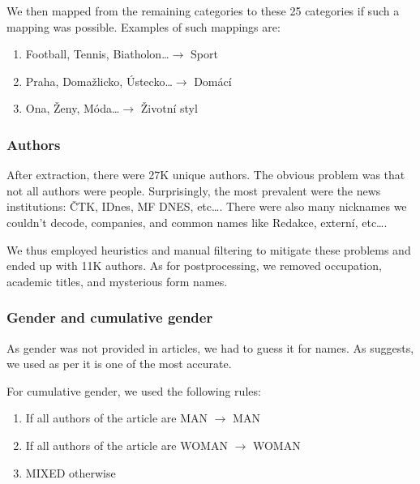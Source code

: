 \begin{itemize}
We then mapped from the remaining categories to these 25 categories if such a mapping was possible.
Examples of such mappings are:
\begin{enumerate}
    \item Football, Tennis, Biatholon\dots $\rightarrow$ Sport
    \item Praha, Domažlicko, Ústecko\dots $\rightarrow$ Domácí
    \item Ona, Ženy, Móda\dots $\rightarrow$ Životní styl
\end{enumerate}


\subsubsection{Authors}
\label{sec:authors}
After extraction, there were 27K unique authors.
The obvious problem was that not all authors were people.
Surprisingly, the most prevalent were the news institutions: ČTK, IDnes, MF DNES, etc\dots.
There were also many nicknames we couldn't decode, companies,
and common names like Redakce, externí, etc\dots.

We thus employed heuristics and manual filtering 
to mitigate these problems and ended up with 11K authors.
As for postprocessing, we removed occupation, academic titles, and mysterious form names.

\subsubsection{Gender and cumulative gender}
\label{sec:gender}
As gender was not provided in articles, we had to guess it for names.
As \cite{seboPerformanceGenderDetection} suggests,
we used \cite{NamsorNameChecker} as per \cite{seboPerformanceGenderDetection}
it is one of the most accurate. 

For cumulative gender, we used the following rules:
\begin{enumerate}
    \item If all authors of the article are MAN $\rightarrow$ MAN
    \item If all authors of the article are WOMAN $\rightarrow$ WOMAN
    \item MIXED otherwise
\end{enumerate}


\end{itemize}
